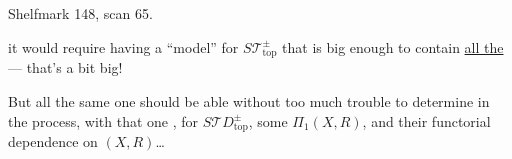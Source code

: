 Shelfmark 148, scan 65.

it would require having a ``model'' for $S\mathcal T_{\mathrm{top}}^\pm$ that is big enough to contain  \uline{all the } --- that's a bit big!

But all the same one should be able without too much trouble to determine in the process, with  that one , for $S\mathcal TD_{\mathrm{top}}^\pm$, some  $\Pi_1(X,R)$, and their functorial dependence on $(X,R)$\ldots
{}
